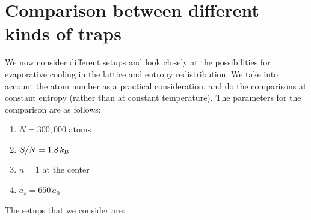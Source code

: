 \section{Comparison between different kinds of traps}

We now consider different setups and look closely at the possibilities for
evaporative cooling in the lattice and entropy redistribution.  We take into
account the atom number as a practical consideration, and do the comparisons at
constant entropy (rather than at constant temperature).  The parameters for the
comparison are as follows: 
\begin{enumerate} \item  $N=300,000$ atoms \item  $S/N = 1.8\,k_{\mathrm{B}}$
\item  $n=1$ at the center \item  $a_{s} = 650\,a_{0}$ 
\end{enumerate} 

The setups that we consider are: 

